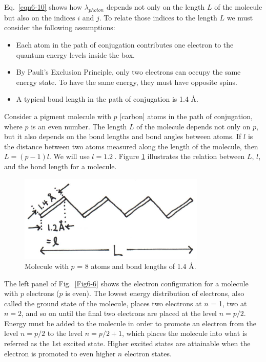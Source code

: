 Eq.~\ref{eqn6-10} shows how $\lambda_{photon}$ depends not only on the length $L$ of the molecule but also on the indices $i$ and $j$. To relate those indices to the length $L$ we must consider the following assumptions:
\begin{itemize}
\item Each atom in the path of conjugation contributes one electron to the quantum energy levels inside the box.
\item By Pauli’s Exclusion Principle, only two electrons can occupy the same energy state.  To have the same energy, they must have opposite spins.
\item A typical bond length in the path of conjugation is 1.4 $\text{\AA}$.
\end{itemize}	  
Consider a pigment molecule with $p$ [carbon] atoms in the path of conjugation, where $p$ is an even number.  The length $L$ of the molecule depends not only on $p$, but it also depends on the bond lengths and bond angles between atoms.  If $l$ is the distance between two atoms measured along the length of the molecule, then $L = (p-1)l$.  We will use $l = 1.2~$\text{\AA}.  Figure \ref{Fig6-5} illustrates the relation between $L$, $l$, and the bond length for a molecule.    
\begin{figure}[h]
	\centering
	\includegraphics[width=3.5in]{./figures/Topic6/Fig6-5.jpg}
	\caption{Molecule with $p$ = 8 atoms and bond lengths of 1.4 $\text{\AA}$.}
	\label{Fig6-5}
\end{figure}
The left panel of Fig.~\ref{Fig6-6} shows the electron configuration for a molecule with $p$ electrons ($p$ is even). The lowest energy distribution of electrons, also called the ground state of the molecule, places two electrons at $n$ = 1, two at $n = 2$, and so on until the final two electrons are placed at the level $n = p/2$. Energy must be added to the molecule in order to promote an electron from the level $n = p/2$ to the level $n = p/2+1$, which places the molecule into what is referred as the 1st excited state. Higher excited states are attainable when the electron is promoted to even higher $n$ electron states.
